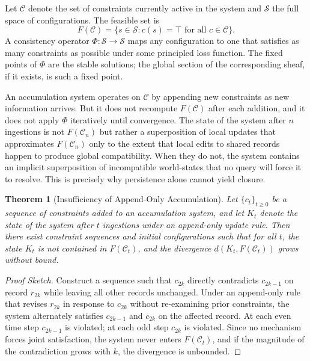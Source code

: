 \documentclass[12pt, oneside]{article}
\newtheorem{theorem}{Theorem}
\begin{document}
Let $\mathcal{C}$ denote the set of constraints currently active in the system and $\mathcal{S}$ the full space of configurations. The feasible set is
\begin{equation}
  F(\mathcal{C}) = \{ s \in \mathcal{S} : c(s) = \top \text{ for all } c \in \mathcal{C} \}.
\end{equation}
A consistency operator $\Phi : \mathcal{S} \to \mathcal{S}$ maps any configuration to one that satisfies as many constraints as possible under some principled loss function. The fixed points of $\Phi$ are the stable solutions; the global section of the corresponding sheaf, if it exists, is such a fixed point.

An accumulation system operates on $\mathcal{C}$ by appending new constraints as new information arrives. But it does not recompute $F(\mathcal{C})$ after each addition, and it does not apply $\Phi$ iteratively until convergence. The state of the system after $n$ ingestions is not $F(\mathcal{C}_n)$ but rather a superposition of local updates that approximates $F(\mathcal{C}_n)$ only to the extent that local edits to shared records happen to produce global compatibility. When they do not, the system contains an implicit superposition of incompatible world-states that no query will force it to resolve. This is precisely why persistence alone cannot yield closure.

\begin{theorem}[Insufficiency of Append-Only Accumulation]
Let $\{c_t\}_{t \geq 0}$ be a sequence of constraints added to an accumulation system, and let $K_t$ denote the state of the system after $t$ ingestions under an append-only update rule. Then there exist constraint sequences and initial configurations such that for all $t$, the state $K_t$ is not contained in $F(\mathcal{C}_t)$, and the divergence $d(K_t, F(\mathcal{C}_t))$ grows without bound.
\end{theorem}

\begin{proof}[Proof Sketch]
Construct a sequence such that $c_{2k}$ directly contradicts $c_{2k-1}$ on record $r_{2k}$ while leaving all other records unchanged. Under an append-only rule that revises $r_{2k}$ in response to $c_{2k}$ without re-examining prior constraints, the system alternately satisfies $c_{2k-1}$ and $c_{2k}$ on the affected record. At each even time step $c_{2k-1}$ is violated; at each odd step $c_{2k}$ is violated. Since no mechanism forces joint satisfaction, the system never enters $F(\mathcal{C}_t)$, and if the magnitude of the contradiction grows with $k$, the divergence is unbounded.
\end{proof}
\end{document}

